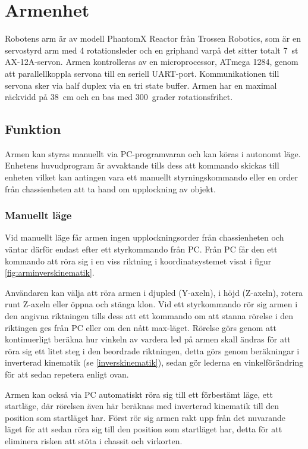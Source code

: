 \section{Armenhet}

Robotens arm är av modell PhantomX Reactor från Trossen Robotics, som är en servostyrd arm med 4 rotationsleder och en griphand varpå det sitter totalt 7~st AX-12A-servon. Armen kontrolleras av en microprocessor, ATmega 1284, genom att parallellkoppla servona till en seriell UART-port. Kommunikationen till servona sker via half duplex via en tri state buffer. Armen har en maximal räckvidd på 38~cm och en bas med  300~grader rotationsfrihet.

\subsection{Funktion}

Armen kan styras manuellt via PC-programvaran och kan köras i autonomt läge. Enhetens huvudprogram är avvaktande tills dess att kommando skickas till enheten vilket kan antingen vara ett manuellt styrningskommando eller en order från chassienheten att ta hand om upplockning av objekt.

\subsubsection{Manuellt läge} 

Vid manuellt läge får armen ingen upplockningsorder från chassienheten och väntar därför endast efter ett styrkommando från PC. Från PC får den ett kommando att röra sig i en viss riktning i koordinatsystemet visat i figur \ref{fig:arminverskinematik}.

Användaren kan välja att röra armen i djupled (Y-axeln), i höjd (Z-axeln), rotera runt Z-axeln eller öppna och stänga klon. Vid ett styrkommando rör sig armen i den angivna riktningen tills dess att ett kommando om att stanna rörelse i den riktingen ges från PC eller om den nått max-läget. Rörelse görs genom att kontinuerligt beräkna hur vinkeln av vardera led på armen skall ändras för att röra sig ett litet steg i den beordrade riktningen, detta görs genom beräkningar i inverterad kinematik (se \ref{inverskinematik}), sedan gör lederna en vinkelförändring för att sedan repetera enligt ovan.

Armen kan också via PC automatiskt röra sig till ett förbestämt läge, ett startläge, där rörelsen även här beräknas med inverterad kinematik till den position som startläget har. Först rör sig armen rakt upp från det nuvarande läget för att sedan röra sig till den position som startläget har, detta för att eliminera risken att stöta i chassit och virkorten.

